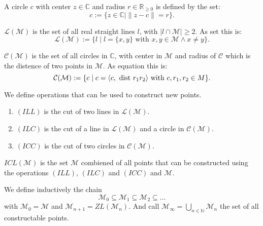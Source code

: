 \begin{definition}[Circle]
    \label{def:circle}
    \leanok
    A circle $c$ with center $z\in\mathbb{C}$ and radius $r\in\mathbb{R}_{\ge 0}$ is defined by the set: $$c:=\{z\in\mathbb{C} \mid\|z-c\|=r\}.$$
\end{definition}

\begin{definition}
    \label{def:set_of_lines}
    \leanok
    $\mathcal{L(M)}$ is the set of all real straight lines $l$, with $| l\cap \mathcal{M} |\ge 2$. As set this is:
    \begin{equation*}
        \mathcal{L(M)} := \{l \mid l = \{x,y\} \text{ with }x,y \in \mathcal{M} \land x \neq y\}.
    \end{equation*}
\end{definition}

\begin{definition}
    \label{def:set_of_circles}
    \leanok
    $\mathcal{C(M)}$ is the set of all circles in $\mathbb{C}$, with center in $\mathcal{M}$ and radius of $\mathcal{C}$ which is the distence of two points in $\mathcal{M}$. As equation this is:
    $$\mathcal{C(M)}:=\{c\mid c = \langle c, \text{ dist } r_1 r_2 \rangle \text{ with } c,r_1,r_2\in M\}.$$
\end{definition}

\begin{definition}
    \label{def:rules_to_constructed_a_point}
    \leanok
    We define operations that can be used to construct new points.
    \begin{enumerate}
        \item $(ILL)$ is the cut of two lines in $\mathcal{L(M)}$.
        \item $(ILC)$ is the cut of a line in $\mathcal{L(M)}$ and a circle in $\mathcal{C(M)}$.
        \item $(ICC)$ is the cut of two circles in $\mathcal{C(M)}$.
    \end{enumerate}
    $ICL(\mathcal{M})$ is the set $\mathcal{M}$ combiened of all points that can be constructed using the operations $(ILL)$, $(ILC)$ and $(ICC)$ and $\mathcal{M}$.
\end{definition}

\begin{definition}
    \label{def:set_of_constructable_points}
    \leanok
    We define inductively the chain
    \begin{equation*}
        \mathcal{M}_0 \subseteq \mathcal{M}_1 \subseteq \mathcal{M}_2 \subseteq \dots
    \end{equation*}
    with $\mathcal{M}_0 = \mathcal{M}$ and $\mathcal{M}_{n+1} = ZL(\mathcal{M}_n)$.\newline
    And call $\mathcal{M}_{\infty} = \bigcup_{n \in \mathbb{N}} \mathcal{M}_n$ the set of all constructable points.
\end{definition}

